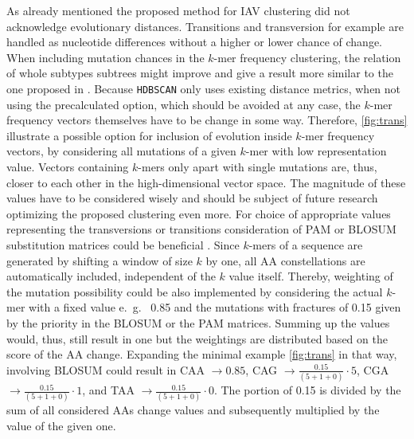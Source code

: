 \vspace{1em}

As already mentioned the proposed method for \gls{IAV} clustering did not acknowledge evolutionary distances. Transitions and transversion for example are handled as nucleotide differences without a higher or lower chance of change. When including mutation chances in the $k$-mer frequency clustering, the relation of whole subtypes subtrees might improve and give a result more similar to the one proposed in \textcite{wei_next-generation_2020}. Because \texttt{HDBSCAN} only uses existing distance metrics, when not using the precalculated option, which should be avoided at any case, the $k$-mer frequency vectors themselves have to be change in some way. Therefore, \autoref{fig:trans} illustrate a possible option for inclusion of evolution inside $k$-mer frequency vectors, by considering all mutations of a given $k$-mer with low representation value. Vectors containing $k$-mers only apart with single mutations are, thus, closer to each other in the high-dimensional vector space. The magnitude of these values have to be considered wisely and should be subject of future research optimizing the proposed clustering even more. For choice of appropriate values representing the transversions or transitions consideration of PAM or BLOSUM substitution matrices could be beneficial \autocite{mount_comparison_2008}. Since $k$-mers of a sequence are generated by shifting a window of size $k$ by one, all \gls{AA} constellations are automatically included, independent of the $k$ value itself. Thereby, weighting of the mutation possibility could be also implemented by considering the actual $k$-mer with a fixed value e.~g.~ 0.85 and the mutations with fractures of 0.15 given by the priority in the BLOSUM or the PAM matrices. Summing up the values would, thus, still result in one but the weightings are distributed based on the score of the \gls{AA} change. Expanding the minimal example \autoref{fig:trans} in that way, involving BLOSUM could result in CAA $\rightarrow 0.85$, CAG $\rightarrow \frac{0.15}{(5+1+0)}\cdot 5$, CGA $\rightarrow \frac{0.15}{(5+1+0)}\cdot 1$, and TAA $\rightarrow \frac{0.15}{(5+1+0)}\cdot 0$. The portion of 0.15 is divided by the sum of all considered \glspl{AA} change values and subsequently multiplied by the value of the given one.